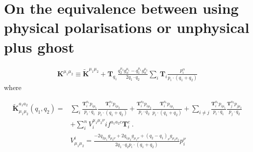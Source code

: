 \documentclass[a4paper,11pt]{article}
\numberwithin{equation}{section}
\newcommand{\bT}{\mathbf{T}}
\newcommand{\ldot}{\!\cdot\!}
\newcommand{\bd}[1]{\mathbf{#1}}
\begin{document}
%

\section{On the equivalence between using physical polarisations or unphysical plus ghost}



\begin{align}
\bd{K}^{\mu_1\mu_2}\equiv  \widetilde{\bd{K}}^{\mu_1\mu_2} 
+\bd{T}_{q_1}   \frac{q_2^{\mu_2} g^{\mu_1}_{\alpha} - q_1^{\mu_1}g^{\mu_2}_{\alpha}}{2q_1\ldot q_2} \sum_i  \bd{T}_i \frac{p_i^\alpha}{p_i \ldot(q_1+q_2)}
\end{align}
where 

\begin{align}
%
 \widetilde{\bd{K}}_{\mu_1\mu_2}^{a_1a_2} (q_1,q_2)=
& \sum_{i}
\frac{\bT_i^{a_1} p_{i\mu_1}}{p_i \ldot q_1}  
\frac{\bT_i^{a_2} p_{i \mu_2}}{p_i \ldot (q_1+q_2)} +
\frac{\bT_i^{a_2} p_{i\mu_2}}{p_i \ldot q_2}  
\frac{\bT_i^{a_1} p_{i \mu_1}}{p_i \ldot (q_1+q_2)} 
+
\sum_{i\ne j}\frac{\bT_i^{a_1} p_{i\mu_1}}{p_i \ldot q_1}  
\frac{\bT_j^{a_2} p_{j \mu_2}}{p_j \ldot q_2}
%
\nonumber \\&
+  \sum_{i}^n  V_i^{\mu_1\mu_2\nu}  if^{a_1a_2c} \bT_i^{c}~.\\
& V^i_{\mu_1\mu_2} = 
\frac{-2q_{2\mu_1}g_{\mu_2\nu}+2q_{1\mu_2}g_{\mu_1\nu}+(q_2-q_1)_\nu g_{\mu_1\mu_2}}{2q_1\ldot q_2 p_i\ldot(q_1+q_2)} p_i^{\nu}\nonumber
\end{align}
\end{document}
